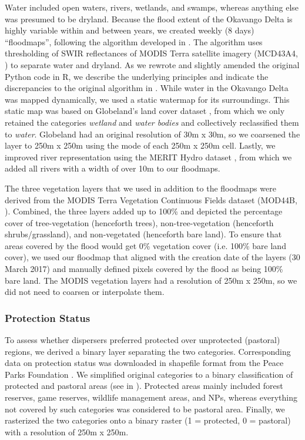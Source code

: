 \documentclass[abstract=on,10pt,a4paper,bibliography=totocnumbered]{scrartcl}
\begin{document}
Water included open waters, rivers, wetlands, and swamps, whereas anything else
was presumed to be dryland. Because the flood extent of the Okavango Delta is
highly variable within and between years, we created weekly (8 days)
``floodmaps'', following the algorithm developed in \cite{Wolski.2017}. The
algorithm uses thresholding of SWIR reflectances of MODIS Terra satellite
imagery (MCD43A4, \cite{Schaaf.2015}) to separate water and dryland. As we
rewrote and slightly amended the original Python code in R, we describe the
underlying principles and indicate the discrepancies to the original algorithm
in . While water in the Okavango Delta was
mapped dynamically, we used a static watermap for its surroundings. This static
map was based on Globeland's land cover dataset \citep{Chen.2015}, from which we
only retained the categories \textit{wetland} and \textit{water bodies} and
collectively reclassified them to \textit{water}. Globeland had an original
resolution of 30m x 30m, so we coarsened the layer to 250m x 250m using the mode
of each 250m x 250m cell. Lastly, we improved river representation using the
MERIT Hydro dataset \citep{Yamazaki.2019}, from which we added all rivers with a
width of over 10m to our floodmaps.

The three vegetation layers that we used in addition to the floodmaps were
derived from the MODIS Terra Vegetation Continuous Fields dataset (MOD44B,
\cite{Dimiceli.2015}). Combined, the three layers added up to 100\% and depicted
the percentage cover of tree-vegetation (henceforth trees), non-tree-vegetation
(henceforth shrubs/grassland), and non-vegetated (henceforth bare land). To
ensure that areas covered by the flood would get 0\% vegetation cover (i.e.
100\% bare land cover), we used our floodmap that aligned with the creation date
of the layers (30 March 2017) and manually defined pixels covered by the flood
as being 100\% bare land. The MODIS vegetation layers had a resolution of 250m x
250m, so we did not need to coarsen or interpolate them.

\subsubsection{Protection Status}
To assess whether dispersers preferred protected over unprotected (pastoral)
regions, we derived a binary layer separating the two categories. Corresponding
data on protection status was downloaded in shapefile format from the Peace
Parks Foundation \citep{PeaceParks.2019}. We simplified original categories to a
binary classification of protected and pastoral areas (see
 in ). Protected areas
mainly included forest reserves, game reserves, wildlife management areas, and
NPs, whereas everything not covered by such categories was considered to be
pastoral area. Finally, we rasterized the two categories onto a binary raster (1
= protected, 0 = pastoral) with a resolution of 250m x 250m.
\end{document}
